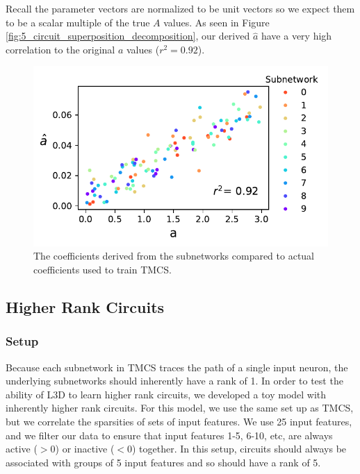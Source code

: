 \documentclass{article}
\theoremstyle{plain}
\theoremstyle{definition}
\theoremstyle{remark}
\begin{document}
Recall the parameter vectors are normalized to be unit vectors so we expect them to be a scalar multiple of the true $A$ values. As seen in Figure \ref{fig:5_circuit_superposition_decomposition}, our derived $\hat{a}$ have a very high correlation to the original $a$ values ($r^2 = 0.92$).



\begin{figure}[htbp]
    \centerline{\includegraphics[width=\columnwidth]{../figures/6_circuit_superposition_coefficients.pdf}}
    \centering
    \caption{The coefficients derived from the subnetworks compared to actual coefficients used to train TMCS.}\label{fig:6_circuit_superposition_coefficients}
\end{figure}


\subsection{Higher Rank Circuits}

\subsubsection{Setup}
Because each subnetwork in TMCS traces the path of a single input neuron, the underlying subnetworks should inherently have a rank of 1. In order to test the ability of L3D to learn higher rank circuits, we developed a toy model with inherently higher rank circuits. For this model, we use the same set up as TMCS, but we correlate the sparsities of sets of input features. We use 25 input features, and we filter our data to ensure that input features 1-5, 6-10, etc, are always active ($>0$) or inactive ($<0$) together. In this setup, circuits should always be associated with groups of 5 input features and so should have a rank of 5.
\end{document}
